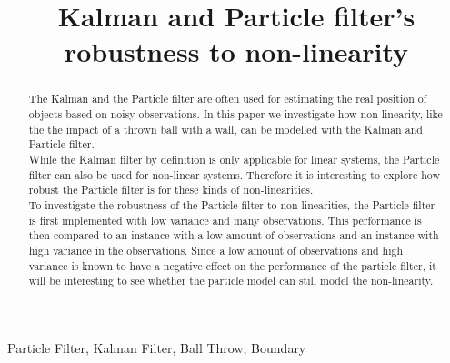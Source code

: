 \documentclass[conference]{IEEEtran}
\begin{document}
\title{Kalman and Particle filter's robustness to non-linearity}

\author{
}
\maketitle

\begin{abstract}
The Kalman and the Particle filter are often used for estimating the real position of objects based on noisy observations.
In this paper we investigate how non-linearity, like the the impact of a thrown ball with a wall, can be modelled with the Kalman and Particle filter. \\
While the Kalman filter by definition is only applicable for linear systems, the Particle filter can also be used for non-linear systems.
Therefore it is interesting to explore how robust the Particle filter is for these kinds of non-linearities. \\
To investigate the robustness of the Particle filter to non-linearities, the Particle filter is first implemented with low variance and many observations.
This performance is then compared to an instance with a low amount of observations and an instance with high variance in the observations.
Since a low amount of observations and high variance is known to have a negative effect on the performance of the particle filter, it will be interesting to see whether the particle model can still model the non-linearity.
\end{abstract}

\begin{IEEEkeywords}
Particle Filter, Kalman Filter, Ball Throw, Boundary
\end{IEEEkeywords}
\end{document}

